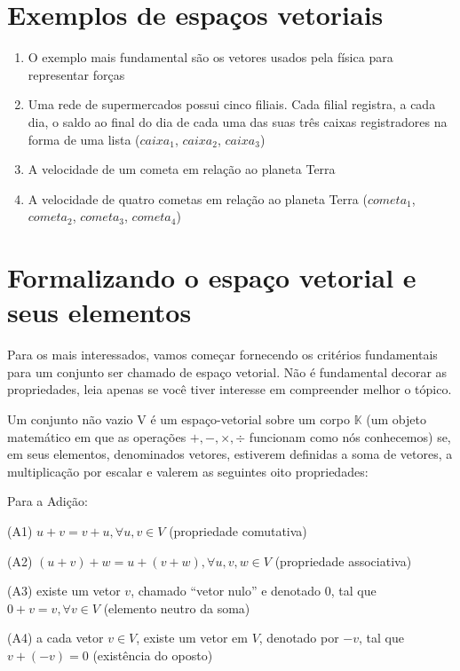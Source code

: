 \documentclass[
  portuguese,
  letterpaper,
  DIV=11,
  numbers=noendperiod]{scrreport}
\providecommand{\tightlist}{%
  \setlength{\itemsep}{0pt}\setlength{\parskip}{0pt}}
\begin{document}
\section{Exemplos de espaços
vetoriais}\label{exemplos-de-espauxe7os-vetoriais}

\begin{enumerate}
\def\labelenumi{\arabic{enumi}.}
\tightlist
\item
  O exemplo mais fundamental são os vetores usados pela física para
  representar forças
\item
  Uma rede de supermercados possui cinco filiais. Cada filial registra,
  a cada dia, o saldo ao final do dia de cada uma das suas três caixas
  registradores na forma de uma lista (\(caixa_{1}\), \(caixa_{2}\),
  \(caixa_{3}\))
\item
  A velocidade de um cometa em relação ao planeta Terra
\item
  A velocidade de quatro cometas em relação ao planeta Terra
  (\(cometa_{1}\), \(cometa_{2}\), \(cometa_{3}\), \(cometa_{4}\))
\end{enumerate}

\section{Formalizando o espaço vetorial e seus
elementos}\label{formalizando-o-espauxe7o-vetorial-e-seus-elementos}

Para os mais interessados, vamos começar fornecendo os critérios
fundamentais para um conjunto ser chamado de espaço vetorial. Não é
fundamental decorar as propriedades, leia apenas se você tiver interesse
em compreender melhor o tópico.

Um conjunto não vazio V é um espaço-vetorial sobre um corpo
\(\mathbb{K}\) (um objeto matemático em que as operações
\(+, -, \times,\div\) funcionam como nós conhecemos) se, em seus
elementos, denominados vetores, estiverem definidas a soma de vetores, a
multiplicação por escalar e valerem as seguintes oito propriedades:

Para a Adição:

(A1) \(u+v = v+u,  \forall  u,v \in V\) (propriedade comutativa)

(A2) \((u+v)+w = u+(v+w),  \forall  u,v,w \in V\) (propriedade
associativa)

(A3) existe um vetor \(v\), chamado ``vetor nulo'' e denotado \(0\), tal
que \(0+v=v, \forall v \in V\) (elemento neutro da soma)

(A4) a cada vetor \(v \in V\), existe um vetor em \(V\), denotado por
\(-v\), tal que \(v+(-v)=0\) (existência do oposto)
\end{document}
